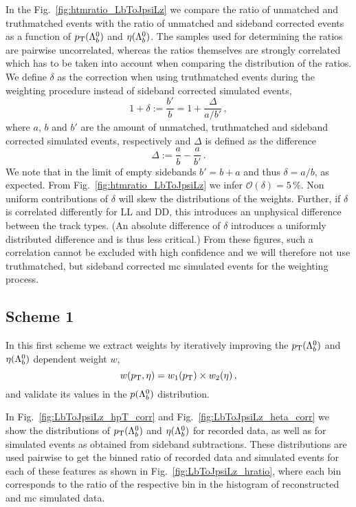 In the Fig.~\ref{fig:htmratio_LbToJpsiLz} we compare the ratio of unmatched and \gls{truthmatched} events with the ratio of unmatched and sideband corrected events as a function of $\mbox{$p_{\mathrm{ T}}$}({{\Lambda}^0_{b}})$ and $\eta({{\Lambda}^0_{b}})$.
The samples used for determining the ratios are pairwise uncorrelated, whereas the ratios themselves are strongly correlated which has to be taken into account when comparing the distribution of the ratios.
We define $\delta$ as the correction when using \gls{truthmatched} events during the weighting procedure instead of sideband corrected simulated events,
\begin{equation}
    \label{eq:weightdelta}
    1 + \delta := \frac{b'}{b} = 1 + \frac{\Delta}{a/b'} \,,
\end{equation}
where $a$, $b$ and $b'$ are the amount of unmatched, \gls{truthmatched} and sideband corrected simulated events, respectively and $\Delta$ is defined as the difference
\begin{equation*}
    \Delta := \frac{a}{b} - \frac{a}{b'} \,.
\end{equation*}
We note that in the limit of empty sidebands $b' = b+a$ and thus $\delta = a/b$, as expected.
From Fig.~\ref{fig:htmratio_LbToJpsiLz} we infer $\mathcal{O}(\delta) = 5\,\%$.
Non uniform contributions of $\delta$ will skew the distributions of the weights.
Further, if $\delta$ is correlated differently for \gls{LL} and \gls{DD}, this introduces an unphysical difference between the track types.
(An absolute difference of $\delta$ introduces a uniformly distributed difference and is thus less critical.)
From these figures, such a correlation cannot be excluded with high confidence and we will therefore not use \gls{truthmatched}, but sideband corrected \gls{mc} simulated events for the weighting process.

\subsection{Scheme 1}
\label{sec:LbToJpsiLz_w1}

In this first scheme we extract weights by iteratively improving the $\mbox{$p_{\mathrm{ T}}$}({{\Lambda}^0_{b}})$ and $\eta({{\Lambda}^0_{b}})$ dependent weight $w$,
\begin{equation*}
    w(\mbox{$p_{\mathrm{ T}}$}, \eta) = w_1(\mbox{$p_{\mathrm{ T}}$}) \times w_2(\eta) \,,
\end{equation*}
and validate its values in the $p({{\Lambda}^0_{b}})$ distribution. 

In Fig.~\ref{fig:LbToJpsiLz_hpT_corr} and Fig.~\ref{fig:LbToJpsiLz_heta_corr} we show the distributions of $\mbox{$p_{\mathrm{ T}}$}({{\Lambda}^0_{b}})$ and $\eta({{\Lambda}^0_{b}})$ for recorded data, as well as for simulated events as obtained from sideband subtractions.
These distributions are used pairwise to get the binned ratio of recorded data and simulated events for each of these features as shown in Fig.~\ref{fig:LbToJpsiLz_hratio}, where each bin corresponds to the ratio of the respective bin in the histogram of reconstructed and \gls{mc} simulated data.

